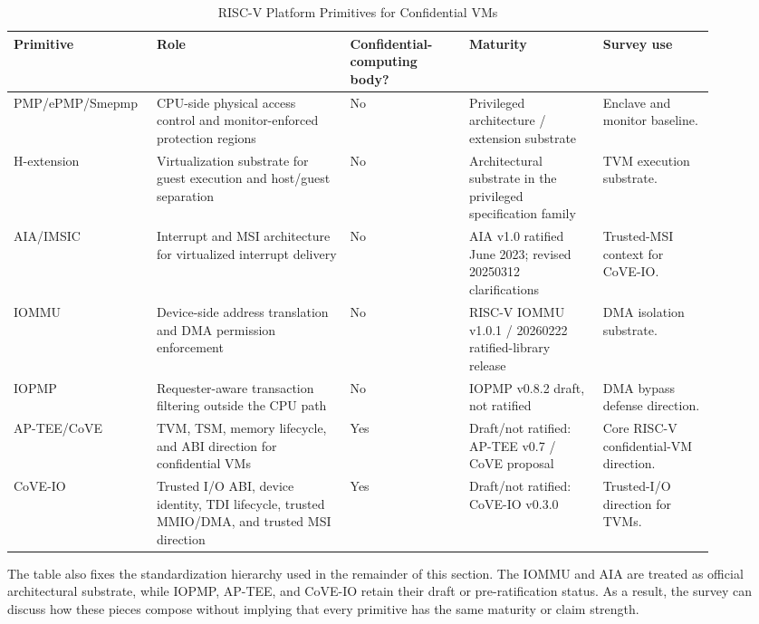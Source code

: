 \begin{table}[t]
\centering
\caption{RISC-V Platform Primitives for Confidential VMs}
\label{tab:riscv_platform_primitives}
\scriptsize
\begin{tabular}{@{}p{0.15\linewidth}p{0.26\linewidth}p{0.16\linewidth}p{0.18\linewidth}p{0.15\linewidth}@{}}
\toprule
\textbf{Primitive} & \textbf{Role} & \textbf{Confidential-computing body?} & \textbf{Maturity} & \textbf{Survey use} \\ \midrule
PMP/ePMP/Smepmp & CPU-side physical access control and monitor-enforced protection regions & No & Privileged architecture / extension substrate & Enclave and monitor baseline. \\
H-extension & Virtualization substrate for guest execution and host/guest separation & No & Architectural substrate in the privileged specification family & TVM execution substrate. \\
AIA/IMSIC & Interrupt and MSI architecture for virtualized interrupt delivery & No & AIA v1.0 ratified June 2023; revised 20250312 clarifications & Trusted-MSI context for CoVE-IO. \\
IOMMU & Device-side address translation and DMA permission enforcement & No & RISC-V IOMMU v1.0.1 / 20260222 ratified-library release & DMA isolation substrate. \\
IOPMP & Requester-aware transaction filtering outside the CPU path & No & IOPMP v0.8.2 draft, not ratified & DMA bypass defense direction. \\
AP-TEE/CoVE & TVM, TSM, memory lifecycle, and ABI direction for confidential VMs & Yes & Draft/not ratified: AP-TEE v0.7 / CoVE proposal & Core RISC-V confidential-VM direction. \\
CoVE-IO & Trusted I/O ABI, device identity, TDI lifecycle, trusted MMIO/DMA, and trusted MSI direction & Yes & Draft/not ratified: CoVE-IO v0.3.0 & Trusted-I/O direction for TVMs. \\ \bottomrule
\end{tabular}
\end{table}

The table also fixes the standardization hierarchy used in the remainder of
this section. The IOMMU and AIA are treated as official architectural
substrate, while IOPMP, AP-TEE, and CoVE-IO retain their draft or
pre-ratification status. As a result, the survey can discuss how these pieces
compose without implying that every primitive has the same maturity or claim
strength.

